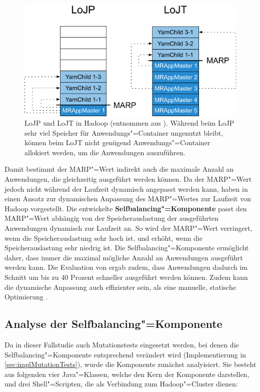 \begin{figure}[h]
    \includegraphics{./images/marpValue.pdf}
    \caption[LoJP und LoJT in Hadoop]
    {LoJP und LoJT in Hadoop (entnommen aus \cite{zhang2016}).
        Während beim LoJP sehr viel Speicher für Anwendungs"=Container ungenutzt bleibt, können beim LoJT nicht genügend Anwendungs"=Container allokiert werden, um die Anwendungen auszuführen.}
    \label{fig:marpValue}
\end{figure}

Damit bestimmt der \ac{MARP}"=Wert indirekt auch die maximale Anzahl an Anwendungen, die gleichzeitig ausgeführt werden können.
Da der \ac{MARP}"=Wert jedoch nicht während der Laufzeit dynamisch angepasst werden kann, haben \citeauthor{zhang2016} in \cite{zhang2016} einen Ansatz zur dynamischen Anpassung des \ac{MARP}"=Wertes zur Laufzeit von Hadoop vorgestellt.
Die entwickelte \textbf{Selfbalancing"=Komponente} passt den \ac{MARP}"=Wert abhängig von der Speicherauslastung der ausgeführten Anwendungen dynamisch zur Laufzeit an.
So wird der \ac{MARP}"=Wert verringert, wenn die Speicherauslastung sehr hoch ist, und erhöht, wenn die Speicherauslastung sehr niedrig ist.
Die Selfbalancing"=Komponente ermöglicht daher, dass immer die maximal mögliche Anzahl an Anwendungen ausgeführt werden kann.
Die Evaluation von \citeauthor{zhang2016} ergab zudem, dass Anwendungen dadurch im Schnitt um bis zu 40 Prozent schneller ausgeführt werden können.
Zudem kann die dynamische Anpassung auch effizienter sein, als eine manuelle, statische Optimierung \cite{zhang2016}.

\subsection{Analyse der Selfbalancing"=Komponente}
\label{sec:selfbalancingAnalysis}

Da in dieser Fallstudie auch Mutationstests eingesetzt werden, bei denen die Selfbalancing"=Komponente entsprechend verändert wird (Implementierung in \autoref{sec:implMutationTests}), wurde die Komponente zunächst analyisiert.
Sie besteht aus folgenden vier Java"=Klassen, welche den Kern der Komponente darstellen, und drei Shell"=Scripten, die als Verbindung zum Hadoop"=Cluster dienen:

